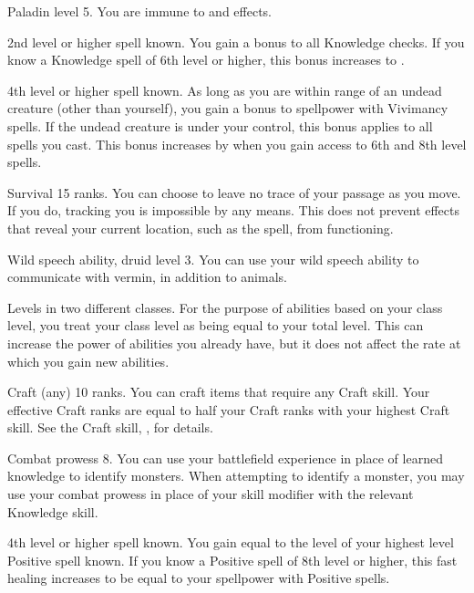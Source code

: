 \featpre Paladin level 5.
\featben You are immune to  and  effects.

\featpre 2nd level or higher  spell known.
\featben You gain a  bonus to all Knowledge checks.
If you know a Knowledge spell of 6th level or higher, this bonus increases to .

\featpre 4th level or higher  spell known.
\featben As long as you are within \rngclose range of an undead creature (other than yourself), you gain a  bonus to spellpower with Vivimancy spells.
If the undead creature is under your control, this bonus applies to all spells you cast.
This bonus increases by  when you gain access to 6th and 8th level spells.

\featpre Survival 15 ranks.
\featben You can choose to leave no trace of your passage as you move.
If you do, tracking you is impossible by any means.
This does not prevent effects that reveal your current location, such as the  spell, from functioning.

\featpres Wild speech ability, druid level 3.
\featben You can use your wild speech ability to communicate with vermin, in addition to animals.

\featpre Levels in two different classes.
\featben For the purpose of abilities based on your class level, you treat your class level as being equal to your total level.
This can increase the power of abilities you already have, but it does not affect the rate at which you gain new abilities.

\featpre Craft (any) 10 ranks.
\featben You can craft items that require any Craft skill.
Your effective Craft ranks are equal to half your Craft ranks with your highest Craft skill.
See the Craft skill, , for details.

\featpre Combat prowess 8.
\featben You can use your battlefield experience in place of learned knowledge to identify monsters.
When attempting to identify a monster, you may use your combat prowess in place of your skill modifier with the relevant Knowledge skill.

\featpre 4th level or higher  spell known.
\featben You gain  equal to the level of your highest level Positive spell known.
If you know a Positive spell of 8th level or higher, this fast healing increases to be equal to your spellpower with Positive spells.

